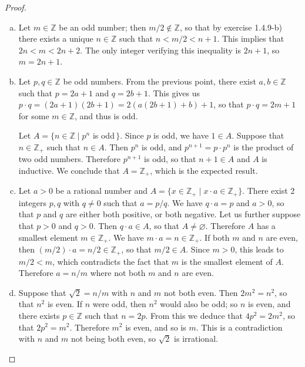 \documentclass[11pt,a4paper,twoside]{article}
\theoremstyle{definition}
\begin{document}
\begin{proof}\hfill

  \begin{enumerate}[(a)]

  \item Let $m \in \mathbb{Z}$ be an odd number; then $m / 2 \notin \mathbb{Z}$, so that by exercise 1.4.9-b) there exists a unique $n \in \mathbb{Z}$ such that
    $n < m / 2 < n + 1$. This implies that $2 n < m < 2 n + 2$. The only integer verifying this inequality is $2 n + 1$, so $m = 2 n + 1$.

  \item Let $p, q \in \mathbb{Z}$ be odd numbers. From the previous point, there exist $a, b \in \mathbb{Z}$ such that $p = 2 a + 1$ and $q = 2 b + 1$.
    This gives us $p \cdot q = (2 a + 1) (2 b + 1) = 2 \left( a \left( 2 b + 1 \right) + b \right) + 1$, so that $p \cdot q = 2 m + 1$ for some $m \in \mathbb{Z}$, and thus is odd.

    Let $A = \{ n \in \mathbb{Z} \mid p^n$ is odd$\,\}$. Since $p$ is odd, we have $1 \in A$.
    Suppose that $n \in \mathbb{Z}_+$ such that $n \in A$. Then $p^n$ is odd, and $p^{n + 1} = p \cdot p^n$ is the product of two odd numbers.
    Therefore $p^{n + 1}$ is odd, so that $n + 1 \in A$ and $A$ is inductive. We conclude that $A = \mathbb{Z}_+$, which is the expected result.

  \item Let $a > 0$ be a rational number and $A = \{ x \in \mathbb{Z}_+ \mid x \cdot a \in \mathbb{Z}_+ \}$. There exist 2 integers $p, q$ with $q \neq 0$ such that $a = p / q$.
    We have $q \cdot a = p$ and $a > 0$, so that $p$ and $q$ are either both positive, or both negative. Let us further suppose that $p > 0$ and $q > 0$.
    Then $q \cdot a \in A$, so that $A \neq \varnothing$. Therefore $A$ has a smallest element $m \in \mathbb{Z}_+$.
    We have $m \cdot a = n \in \mathbb{Z}_+$. If both $m$ and $n$ are even, then $(m / 2) \cdot a = n / 2 \in \mathbb{Z}_+$, so that $m / 2 \in A$.
    Since $m > 0$, this leads to $m / 2 < m$, which contradicts the fact that $m$ is the smallest element of $A$.
    Therefore $a = n / m$ where not both $m$ and $n$ are even.

  \item Suppose that $\sqrt{2} = n / m$ with $n$ and $m$ not both even. Then $2 m^2 = n^2$, so that $n^2$ is even.
    If $n$ were odd, then $n^2$ would also be odd; so $n$ is even, and there exists $p \in \mathbb{Z}$ such that $n = 2 p$.
    From this we deduce that $4 p^2 = 2 m^2$, so that $2 p^2 = m^2$. Therefore $m^2$ is even, and so is $m$.
    This is a contradiction with $n$ and $m$ not being both even, so $\sqrt{2}$ is irrational.\qedhere

  \end{enumerate}

\end{proof}
\end{document}
